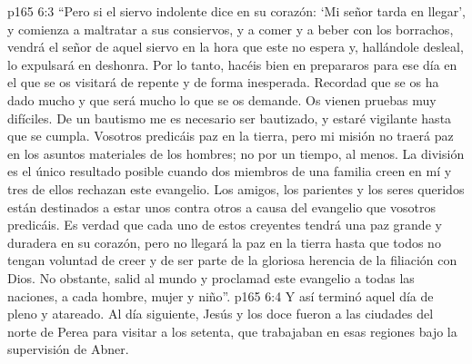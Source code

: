 \vs p165 6:3 “Pero si el siervo indolente dice en su corazón: ‘Mi señor tarda en llegar’, y comienza a maltratar a sus consiervos, y a comer y a beber con los borrachos, vendrá el señor de aquel siervo en la hora que este no espera y, hallándole desleal, lo expulsará en deshonra. Por lo tanto, hacéis bien en prepararos para ese día en el que se os visitará de repente y de forma inesperada. Recordad que se os ha dado mucho y que será mucho lo que se os demande. Os vienen pruebas muy difíciles. De un bautismo me es necesario ser bautizado, y estaré vigilante hasta que se cumpla. Vosotros predicáis paz en la tierra, pero mi misión no traerá paz en los asuntos materiales de los hombres; no por un tiempo, al menos. La división es el único resultado posible cuando dos miembros de una familia creen en mí y tres de ellos rechazan este evangelio. Los amigos, los parientes y los seres queridos están destinados a estar unos contra otros a causa del evangelio que vosotros predicáis. Es verdad que cada uno de estos creyentes tendrá una paz grande y duradera en su corazón, pero no llegará la paz en la tierra hasta que todos no tengan voluntad de creer y de ser parte de la gloriosa herencia de la filiación con Dios. No obstante, salid al mundo y proclamad este evangelio a todas las naciones, a cada hombre, mujer y niño”.
\vs p165 6:4 \pc Y así terminó aquel día de  pleno y atareado. Al día siguiente, Jesús y los doce fueron a las ciudades del norte de Perea para visitar a los setenta, que trabajaban en esas regiones bajo la supervisión de Abner.
